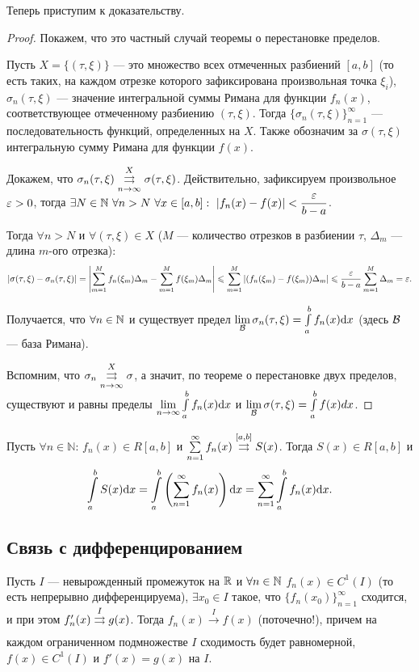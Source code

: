 Теперь приступим к доказательству.
\begin{proof}
Покажем, что это частный случай теоремы о перестановке пределов.

Пусть $X = \{(\tau, \xi) \}$ --- это множество всех отмеченных разбиений $[a, b]$ (то есть таких, на каждом отрезке которого зафиксирована произвольная точка $\xi_i$), $\sigma_n(\tau, \xi)$ --- значение интегральной суммы Римана для функции $f_n(x)$, соответствующее отмеченному разбиению $(\tau, \xi)$. Тогда $\{\sigma_n(\tau, \xi) \}_{n=1}^\infty$ --- последовательность функций, определенных на $X$. Также обозначим за $\sigma(\tau, \xi)$ интегральную сумму Римана для функции $f(x)$.

Докажем, что $\sigma_n(\tau, \xi) \overset{X}{\underset{n \to \infty}{\rightrightarrows}} \sigma(\tau, \xi)$. Действительно, зафиксируем произвольное $\varepsilon > 0$, тогда $\exists N \in \N\ \forall n > N\ \forall x \in[a, b]:\ |f_n(x) - f(x)| < \dfrac{\eps}{b-a}$.

Тогда $\forall n > N$ и $\forall (\tau, \xi) \in X$ ($M$ --- количество отрезков в разбиении $\tau$, $\Delta_m$ --- длина $m$-ого отрезка):
\begin{gather}
|\sigma(\tau, \xi) - \sigma_n(\tau, \xi)| = \left| \sum\limits_{m=1}^{M}f_n(\xi_m)\Delta_m - \sum\limits_{m=1}^{M}f(\xi_m)\Delta_m \right| \leqslant \sum\limits_{m=1}^M \left| (f_n(\xi_m) - f(\xi_m))\Delta_m \right| \leqslant \frac{\varepsilon}{b-a}\sum\limits_{m=1}^M \Delta_m = \varepsilon.
\end{gather}

Получается, что $\forall n \in \mathbb{N}$ и существует предел $\lim\limits_{\mathcal{B}} \sigma_n(\tau, \xi) = \int\limits_a^bf_n(x)\mathrm{d}x$ (здесь $\mathcal{B}$ --- база Римана).

Вспомним, что $\sigma_n \overset{X}{\underset{n \to \infty}{\rightrightarrows}} \sigma$, а значит, по теореме о перестановке двух пределов, существуют и равны пределы $\lim\limits_{n \to \infty} \int\limits_a^b f_n(x) \mathrm{d}x$ и $\lim\limits_{\mathcal{B}}\sigma(\tau, \xi) = \int\limits_a^bf(x)dx$.
\end{proof}

\begin{Consequence}
Пусть $\forall n \in \mathbb{N}$: $f_n(x) \in R[a, b]$ и $\sum\limits_{n=1}^{\infty} f_n(x) \overset{[a, b]}{\underset{}{\rightrightarrows}} S(x)$. Тогда $S(x) \in R[a, b]$ и 
$$
\int\limits_a^bS(x) \mathrm{d}x = \int\limits_a^b \left(\sum\limits_{n=1}^{\infty} f_n(x)\right) \mathrm{d}x = \sum\limits_{n=1}^{\infty} \int\limits_a^b f_n(x)\mathrm{d}x.
$$
\end{Consequence}

\subsection{Связь с дифференцированием}
\begin{Statement}
Пусть $I$ --- невырожденный промежуток на $\mathbb{R}$ и $\forall n \in \mathbb{N}$ $f_n(x) \in C^1(I)$ (то есть непрерывно дифференцируема), $\exists x_0 \in I$ такое, что $\{f_n(x_0) \}_{n=1}^\infty$ сходится, и при этом $f'_n(x) \overset{I}{\underset{}{\rightrightarrows}}g(x)$.
Тогда $f_n(x) \overset{I}{\to} f(x)$ (поточечно!), причем на каждом ограниченном подмножестве $I$ сходимость будет равномерной, $f(x) \in C^1(I)$ и $f'(x) = g(x)$ на $I$.
\end{Statement}

